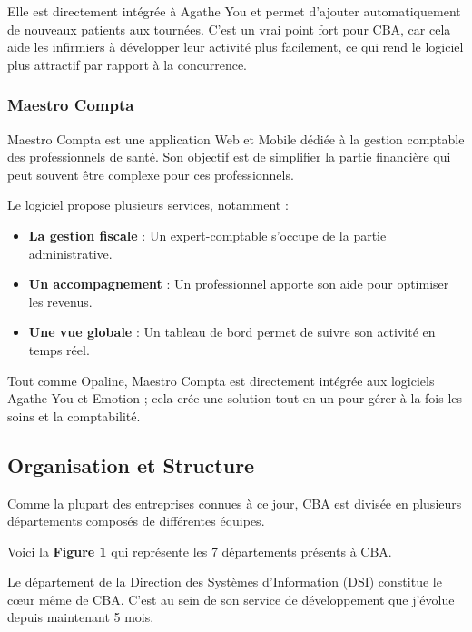 \documentclass{article}
\begin{document}
Elle est directement intégrée à Agathe You et permet d'ajouter automatiquement de nouveaux patients aux tournées. C'est un vrai point fort pour CBA, car cela aide les infirmiers à développer leur activité plus facilement, ce qui rend le logiciel plus attractif par rapport à la concurrence.

\subsubsection{Maestro Compta}

Maestro Compta est une application Web et Mobile dédiée à la gestion comptable des professionnels de santé. Son objectif est de simplifier la partie financière qui peut souvent être complexe pour ces professionnels.

Le logiciel propose plusieurs services, notamment :

\begin{itemize}
    \item \textbf{La gestion fiscale} : Un expert-comptable s'occupe de la partie administrative.
    \item \textbf{Un accompagnement} : Un professionnel apporte son aide pour optimiser les revenus.
    \item \textbf{Une vue globale} : Un tableau de bord permet de suivre son activité en temps réel.
\end{itemize}

Tout comme Opaline, Maestro Compta est directement intégrée aux logiciels Agathe You et Emotion ; cela crée une solution tout-en-un pour gérer à la fois les soins et la comptabilité.

\newpage

\subsection{Organisation et Structure}

Comme la plupart des entreprises connues à ce jour, CBA est divisée en plusieurs départements composés de différentes équipes.

Voici la \textbf{Figure 1} qui représente les 7 départements présents à CBA.


Le département de la Direction des Systèmes d'Information (DSI) constitue le cœur même de CBA. C'est au sein de son service de développement que j'évolue depuis maintenant 5 mois.
\end{document}
